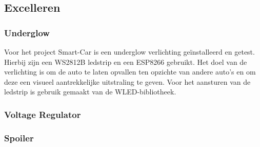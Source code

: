 \subsection{Excelleren}
\subsubsection{Underglow}
Voor het project \gls{Smart-Car} is een underglow verlichting geïnstalleerd en getest. Hierbij zijn een \gls{WS2812B}\cite{WS2812B} ledstrip en een \gls{ESP8266}\cite{ESP8266} gebruikt. Het doel van de verlichting is om de auto te laten opvallen ten opzichte van andere auto's en om deze een visueel aantrekkelijke uitstraling te geven. Voor het aansturen van de ledstrip is gebruik gemaakt van de \gls{WLED}-bibliotheek.
\subsubsection{Voltage Regulator}
\subsubsection{Spoiler}